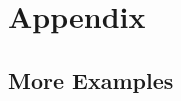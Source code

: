 \documentclass{llncs}
\begin{document}





\appendix
\section{Appendix}
\subsection{More Examples}
\end{document}
